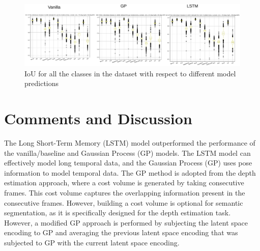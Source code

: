 	\begin{figure}
		\centering
		\includegraphics[width=19cm]{images/IoU_five.png}
		\caption{IoU for all the classes in the dataset with respect to different model predictions}
		\label{fig:performance_metric_three_classes_unet_five}
	\end{figure}
	
	
	\section{Comments and Discussion}   
	
	The Long Short-Term Memory (LSTM) model outperformed the performance of the vanilla/baseline and Gaussian Process (GP) models. The LSTM model can effectively model long temporal data, and the Gaussian Process (GP) uses pose information to model temporal data. The GP method is adopted from the depth estimation approach, where a cost volume is generated by taking consecutive frames. This cost volume captures the overlapping information present in the consecutive frames. However, building a cost volume is optional for semantic segmentation, as it is specifically designed for the depth estimation task.
	However, a modified GP approach is performed by subjecting the latent space encoding to GP and averaging the previous latent space encoding that was subjected to GP with the current latent space encoding.
	

